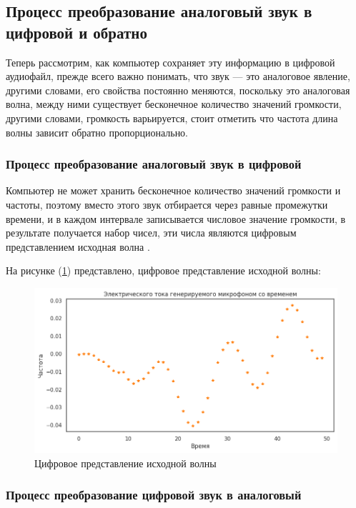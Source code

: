 \subsection{Процесс преобразование аналоговый звук в цифровой и обратно}

Теперь рассмотрим, как компьютер сохраняет эту информацию в цифровой аудиофайл, прежде всего важно понимать, что звук — это аналоговое явление, другими словами, его свойства постоянно меняются, поскольку это аналоговая волна, между ними существует бесконечное количество значений громкости, другими словами, громкость варьируется, стоит отметить что частота длина волны зависит обратно пропорционально.

\subsubsection{Процесс преобразование аналоговый звук в цифровой}

Компьютер не может хранить бесконечное количество значений громкости и частоты, поэтому вместо этого звук отбирается через равные промежутки времени, и в каждом интервале записывается числовое значение громкости, в результате получается набор чисел, эти числа являются цифровым представлением исходная волна \cite{salah2021spatial}.

На рисунке (\ref{fig:ampl_and_time}) представлено, цифровое представление исходной волны: 
\begin{figure}[H]
	\centering
	\includegraphics[width=0.8\linewidth]{images/aplitude_and_time.png}
	\caption{Цифровое представление исходной волны}
	\label{fig:ampl_and_time}
\end{figure}

\subsubsection{Процесс преобразование цифровой звук в аналоговый}

